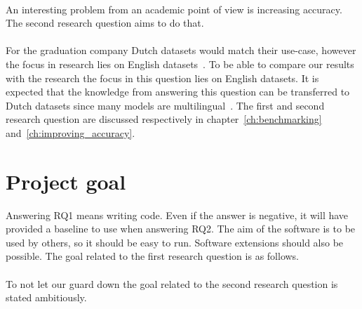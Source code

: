 \rqone \\[1mm]

An interesting problem from an academic point of view is increasing accuracy.
The second research question aims to do that.\\

\rqtwo \\[1mm]

For the graduation company Dutch datasets would match their use-case, however the focus in research lies on English datasets~\citep{cambria2014jumping,young2018recent}.
To be able to compare our results with the research the focus in this question lies on English datasets.
It is expected that the knowledge from answering this question can be transferred to Dutch datasets since many models are multilingual~\citep{devlin2018}.
The first and second research question are discussed respectively in chapter~\ref{ch:benchmarking} and~\ref{ch:improving_accuracy}.

\section{Project goal}
\label{sec:project_goal}
Answering RQ1 means writing code.
Even if the answer is negative, it will have provided a baseline to use when answering RQ2.
The aim of the software is to be used by others, so it should be easy to run.
Software extensions should also be possible.
The goal related to the first research question is as follows.\\

\rgone \\

\noindent To not let our guard down the goal related to the second research question is stated ambitiously.\\

\rgtwo